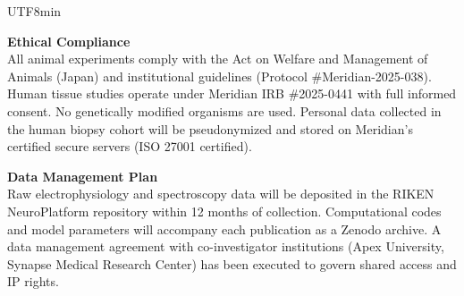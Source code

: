 \documentclass[11pt,a4paper]{article}
\newcommand{\bilabel}[2]{%
  \textbf{\textcolor{jspsNavy}{#1}}\enspace{\footnotesize\textcolor{jspsSlate}{(#2)}}%
}
\begin{document}
\begin{CJK}{UTF8}{min}
\begin{tcolorbox}[jspsSection,
  title={\faLock\enspace \bilabel{Ethics and Data Management}{倫理・データ管理} \hfill \small Section 8}]
\noindent\begin{minipage}[t]{0.48\linewidth}
  \begin{tcolorbox}[jspsInfo]
    \small
    \textbf{\textcolor{jspsNavy}{Ethical Compliance}}\\[3pt]
    All animal experiments comply with the Act on Welfare and Management of Animals (Japan) and institutional guidelines (Protocol \#Meridian-2025-038). Human tissue studies operate under Meridian IRB \#2025-0441 with full informed consent. No genetically modified organisms are used. Personal data collected in the human biopsy cohort will be pseudonymized and stored on Meridian's certified secure servers (ISO 27001 certified).
  \end{tcolorbox}
\end{minipage}%
\hfill
\begin{minipage}[t]{0.48\linewidth}
  \begin{tcolorbox}[jspsInfo]
    \small
    \textbf{\textcolor{jspsNavy}{Data Management Plan}}\\[3pt]
    Raw electrophysiology and spectroscopy data will be deposited in the RIKEN NeuroPlatform repository within 12 months of collection. Computational codes and model parameters will accompany each publication as a Zenodo archive. A data management agreement with co-investigator institutions (Apex University, Synapse Medical Research Center) has been executed to govern shared access and IP rights.
  \end{tcolorbox}
\end{minipage}

\end{tcolorbox}

\vspace{6pt}


\end{CJK}
\end{document}

